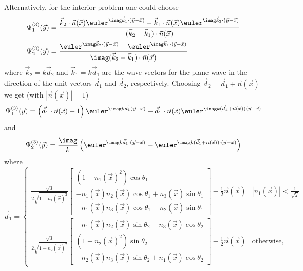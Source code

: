 Alternatively, for the interior problem one could choose
\begin{equation*}
\begin{aligned}
	\Psi_1^{(3)}(\vec{y}) &= \frac{\vec{k}_2\cdot\vec{n}(\vec{x})\euler^{\imag\vec{k}_1\cdot(\vec{y}-\vec{x})}-\vec{k}_1\cdot\vec{n}(\vec{x})\euler^{\imag\vec{k}_2\cdot(\vec{y}-\vec{x})}}{(\vec{k}_2-\vec{k}_1)\cdot\vec{n}(\vec{x})}\\
	\Psi_2^{(3)}(\vec{y}) &= \frac{\euler^{\imag\vec{k}_2\cdot(\vec{y}-\vec{x})}-\euler^{\imag\vec{k}_1\cdot(\vec{y}-\vec{x})}}{\imag(\vec{k}_2-\vec{k}_1)\cdot\vec{n}(\vec{x})}
\end{aligned}
\end{equation*}
where $\vec{k}_2 = k\vec{d}_2$ and $\vec{k}_1 = k\vec{d}_1$ are the wave vectors for the plane wave in the direction of the unit vectors $\vec{d}_1$ and $\vec{d}_2$, respectively. Choosing $\vec{d}_2=\vec{d}_1+\vec{n}(\vec{x})$ we get (with $|\vec{n}(\vec{x})|=1$)
\begin{equation*}
	\Psi_1^{(3)}(\vec{y}) = \left(\vec{d}_1\cdot\vec{n}(\vec{x})+1\right)\euler^{\imag k\vec{d}_1(\vec{y}-\vec{x})} - \vec{d}_1\cdot\vec{n}(\vec{x})\euler^{\imag k(\vec{d}_1 + \vec{n}(\vec{x}))(\vec{y}-\vec{x})}
\end{equation*}
and
\begin{equation*}
	\Psi_2^{(3)}(\vec{y}) = \frac{\imag}{k}\left(\euler^{\imag k\vec{d}_1\cdot(\vec{y}-\vec{x})}-\euler^{\imag k(\vec{d}_1+\vec{n}(\vec{x}))\cdot(\vec{y}-\vec{x})}\right)
\end{equation*}
where
\begin{equation}\label{Eq3:generald1}
	\vec{d}_1 = \begin{cases} \frac{\sqrt{3}}{2\sqrt{1-n_1(\vec{x})^2}}\begin{bmatrix}
		(1-n_1(\vec{x})^2)\cos\theta_1\\
		-n_1(\vec{x}) n_2(\vec{x}) \cos\theta_1 + n_3(\vec{x}) \sin\theta_1\\
		-n_1(\vec{x}) n_3(\vec{x}) \cos\theta_1 - n_2(\vec{x}) \sin\theta_1
	\end{bmatrix}-\frac{1}{2}\vec{n}(\vec{x}) & |n_1(\vec{x})| < \frac{1}{\sqrt{2}}\\
	\frac{\sqrt{3}}{2\sqrt{1-n_2(\vec{x})^2}}\begin{bmatrix}
		-n_1(\vec{x}) n_2(\vec{x}) \sin\theta_2 - n_3(\vec{x}) \cos\theta_2\\
		(1-n_2(\vec{x})^2)\sin\theta_2\\
		-n_2(\vec{x}) n_3(\vec{x}) \sin\theta_2 + n_1(\vec{x}) \cos\theta_2
	\end{bmatrix}-\frac{1}{2}\vec{n}(\vec{x}) & \text{otherwise,}
	\end{cases}
\end{equation}
